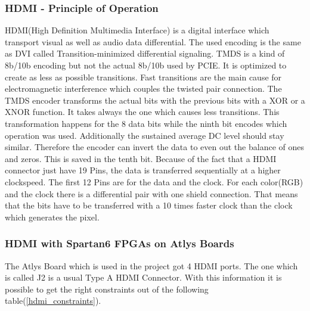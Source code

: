 \subsubsection{HDMI - Principle of Operation}
HDMI(High Definition Multimedia Interface) is a digital interface which transport visual as well as audio data differential. The used encoding is the same as DVI called Transition-minimized differential signaling. TMDS is a kind of 8b/10b encoding but not the actual 8b/10b used by PCIE. It is optimized to create as less as possible transitions. Fast transitions are the main cause for electromagnetic interference which couples the twisted pair connection. \newline
The TMDS encoder transforms the actual bits with the previous bits with a XOR or a XNOR function. It takes always the one which causes less transitions. This transformation happens for the 8 data bits while the ninth bit encodes which operation was used. Additionally the sustained average DC level should stay similar. Therefore the encoder can invert the data to even out the balance of ones and zeros. This is saved in the tenth bit. \newline
Because of the fact that a HDMI connector just have 19 Pins, the data is transferred sequentially at a higher clockspeed. The first 12 Pins are for the data and the clock. For each color(RGB) and the clock there is a differential pair with one shield connection. That means that the bits have to be transferred with a 10 times faster clock than the clock which generates the pixel.



\subsubsection{HDMI with Spartan6 FPGAs on Atlys Boards}
The Atlys Board which is used in the project got 4 HDMI ports. The one which is called J2 is a usual Type A HDMI Connector. With this information it is possible to get the right constraints out of the following table(\ref{hdmi_constraints}).

